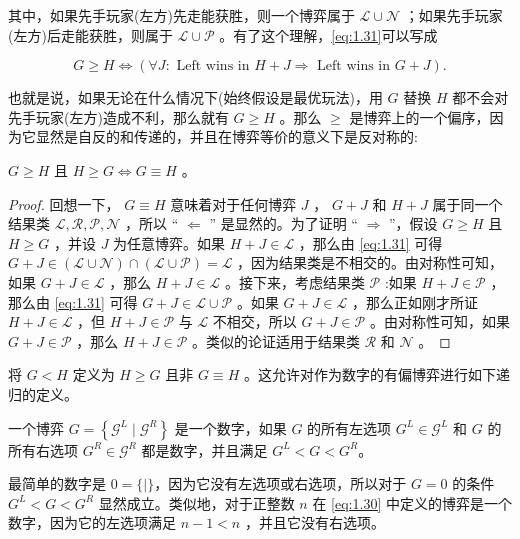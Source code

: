 其中，如果先手玩家(左方)先走能获胜，则一个博弈属于 \(\mathcal{L} \cup  \mathcal{N}\) ；如果先手玩家(左方)后走能获胜，则属于 \(\mathcal{L} \cup  \mathcal{P}\) 。有了这个理解，\eqref{eq:1.31}可以写成

\[
G \geq  H \Leftrightarrow  \left( {\forall J : \text{ Left wins in }H + J \Rightarrow  \text{ Left wins in }G + J}\right) .
\]

也就是说，如果无论在什么情况下(始终假设是最优玩法)，用 \(G\) 替换 \(H\) 都不会对先手玩家(左方)造成不利，那么就有 \(G \geq  H\) 。那么 \(\geq\) 是博弈上的一个偏序，因为它显然是自反的和传递的，并且在博弈等价的意义下是反对称的:

\begin{lemma}\label{lem:1.17}\(G \geq  H\) 且 \(H \geq  G \Leftrightarrow  G \equiv  H\) 。
\end{lemma}
\begin{proof}回想一下， \(G \equiv  H\) 意味着对于任何博弈 \(J\) ， \(G + J\) 和 \(H + J\) 属于同一个结果类 \(\mathcal{L},\mathcal{R},\mathcal{P},\mathcal{N}\) ，所以 “ \(\Leftarrow\) ” 是显然的。为了证明 “ \(\Rightarrow\) ”，假设 \(G \geq  H\) 且 \(H \geq  G\) ，并设 \(J\) 为任意博弈。如果 \(H + J \in  \mathcal{L}\) ，那么由 \eqref{eq:1.31} 可得 \(G + J \in  \left( {\mathcal{L} \cup  \mathcal{N}}\right)  \cap  \left( {\mathcal{L} \cup  \mathcal{P}}\right)  = \mathcal{L}\) ，因为结果类是不相交的。由对称性可知，如果 \(G + J \in  \mathcal{L}\) ，那么 \(H + J \in  \mathcal{L}\) 。接下来，考虑结果类 \(\mathcal{P}\) :如果 \(H + J \in  \mathcal{P}\) ，那么由 \eqref{eq:1.31} 可得 \(G + J \in  \mathcal{L} \cup  \mathcal{P}\) 。如果 \(G + J \in  \mathcal{L}\) ，那么正如刚才所证 \(H + J \in  \mathcal{L}\) ，但 \(H + J \in  \mathcal{P}\) 与 \(\mathcal{L}\) 不相交，所以 \(G + J \in  \mathcal{P}\) 。由对称性可知，如果 \(G + J \in  \mathcal{P}\) ，那么 \(H + J \in  \mathcal{P}\) 。类似的论证适用于结果类 \(\mathcal{R}\) 和 \(\mathcal{N}\) 。
\end{proof}


将 \(G < H\) 定义为 \(H \geq  G\) 且非 \(G \equiv  H\) 。这允许对作为数字的有偏博弈进行如下递归的定义。

\begin{definition}\label{def:1.18}一个博弈 \(G = \left\{  {{\mathcal{G}}^{L} \mid  {\mathcal{G}}^{R}}\right\}\) 是一个数字，如果 \(G\) 的所有左选项 \({G}^{L} \in  {\mathcal{G}}^{L}\) 和 \(G\) 的所有右选项 \({G}^{R} \in  {\mathcal{G}}^{R}\) 都是数字，并且满足 \({G}^{L} < G < {G}^{R}\)。
\end{definition}
最简单的数字是 \(0=\{\mid\}\)，因为它没有左选项或右选项，所以对于 \(G = 0\) 的条件 \({G}^{L} < G < {G}^{R}\) 显然成立。类似地，对于正整数 \(n\) 在 \eqref{eq:1.30} 中定义的博弈是一个数字，因为它的左选项满足 \(n - 1 < n\) ，并且它没有右选项。

